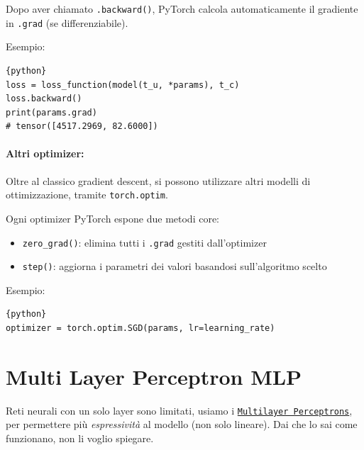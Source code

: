 Dopo aver chiamato \texttt{.backward()}, PyTorch calcola automaticamente il gradiente in \texttt{.grad} (se differenziabile). 

Esempio:
\begin{lstlisting}{python}
loss = loss_function(model(t_u, *params), t_c)
loss.backward()
print(params.grad)
# tensor([4517.2969, 82.6000])
\end{lstlisting}

\paragraph{Altri optimizer:} Oltre al classico gradient descent, si possono utilizzare altri modelli di ottimizzazione, tramite \texttt{torch.optim}.

Ogni optimizer PyTorch espone due metodi core: 
\begin{itemize}
    \item \texttt{zero\_grad()}: elimina tutti i \texttt{.grad} gestiti dall'optimizer
    
    \item \texttt{step()}: aggiorna i parametri dei valori basandosi sull'algoritmo scelto
\end{itemize}

Esempio: 
\begin{lstlisting}{python}
optimizer = torch.optim.SGD(params, lr=learning_rate)
\end{lstlisting}

\section{Multi Layer Perceptron MLP}

Reti neurali con un solo layer sono limitati, usiamo i \href{https://it.wikipedia.org/wiki/Percettrone_multistrato}{\texttt{Multilayer Perceptrons}}, per permettere più \textit{espressività} al modello (non solo lineare). Dai che lo sai come funzionano, non li voglio spiegare.

